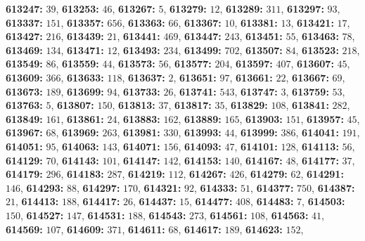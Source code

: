 \textsf{\bfseries 613247:} $39$, \textsf{\bfseries 613253:} $46$, \textsf{\bfseries 613267:} $5$, \textsf{\bfseries 613279:} $12$, \textsf{\bfseries 613289:} $311$, \textsf{\bfseries 613297:} $93$, \textsf{\bfseries 613337:} $151$, \textsf{\bfseries 613357:} $656$, \textsf{\bfseries 613363:} $66$, \textsf{\bfseries 613367:} $10$, \textsf{\bfseries 613381:} $13$, \textsf{\bfseries 613421:} $17$, \textsf{\bfseries 613427:} $216$, \textsf{\bfseries 613439:} $21$, \textsf{\bfseries 613441:} $469$, \textsf{\bfseries 613447:} $243$, \textsf{\bfseries 613451:} $55$, \textsf{\bfseries 613463:} $78$, \textsf{\bfseries 613469:} $134$, \textsf{\bfseries 613471:} $12$, \textsf{\bfseries 613493:} $234$, \textsf{\bfseries 613499:} $702$, \textsf{\bfseries 613507:} $84$, \textsf{\bfseries 613523:} $218$, \textsf{\bfseries 613549:} $86$, \textsf{\bfseries 613559:} $44$, \textsf{\bfseries 613573:} $56$, \textsf{\bfseries 613577:} $204$, \textsf{\bfseries 613597:} $407$, \textsf{\bfseries 613607:} $45$, \textsf{\bfseries 613609:} $366$, \textsf{\bfseries 613633:} $118$, \textsf{\bfseries 613637:} $2$, \textsf{\bfseries 613651:} $97$, \textsf{\bfseries 613661:} $22$, \textsf{\bfseries 613667:} $69$, \textsf{\bfseries 613673:} $189$, \textsf{\bfseries 613699:} $94$, \textsf{\bfseries 613733:} $26$, \textsf{\bfseries 613741:} $543$, \textsf{\bfseries 613747:} $3$, \textsf{\bfseries 613759:} $53$, \textsf{\bfseries 613763:} $5$, \textsf{\bfseries 613807:} $150$, \textsf{\bfseries 613813:} $37$, \textsf{\bfseries 613817:} $35$, \textsf{\bfseries 613829:} $108$, \textsf{\bfseries 613841:} $282$, \textsf{\bfseries 613849:} $161$, \textsf{\bfseries 613861:} $24$, \textsf{\bfseries 613883:} $162$, \textsf{\bfseries 613889:} $165$, \textsf{\bfseries 613903:} $151$, \textsf{\bfseries 613957:} $45$, \textsf{\bfseries 613967:} $68$, \textsf{\bfseries 613969:} $263$, \textsf{\bfseries 613981:} $330$, \textsf{\bfseries 613993:} $44$, \textsf{\bfseries 613999:} $386$, \textsf{\bfseries 614041:} $191$, \textsf{\bfseries 614051:} $95$, \textsf{\bfseries 614063:} $143$, \textsf{\bfseries 614071:} $156$, \textsf{\bfseries 614093:} $47$, \textsf{\bfseries 614101:} $128$, \textsf{\bfseries 614113:} $56$, \textsf{\bfseries 614129:} $70$, \textsf{\bfseries 614143:} $101$, \textsf{\bfseries 614147:} $142$, \textsf{\bfseries 614153:} $140$, \textsf{\bfseries 614167:} $48$, \textsf{\bfseries 614177:} $37$, \textsf{\bfseries 614179:} $296$, \textsf{\bfseries 614183:} $287$, \textsf{\bfseries 614219:} $112$, \textsf{\bfseries 614267:} $426$, \textsf{\bfseries 614279:} $62$, \textsf{\bfseries 614291:} $146$, \textsf{\bfseries 614293:} $88$, \textsf{\bfseries 614297:} $170$, \textsf{\bfseries 614321:} $92$, \textsf{\bfseries 614333:} $51$, \textsf{\bfseries 614377:} $750$, \textsf{\bfseries 614387:} $21$, \textsf{\bfseries 614413:} $188$, \textsf{\bfseries 614417:} $26$, \textsf{\bfseries 614437:} $15$, \textsf{\bfseries 614477:} $408$, \textsf{\bfseries 614483:} $7$, \textsf{\bfseries 614503:} $150$, \textsf{\bfseries 614527:} $147$, \textsf{\bfseries 614531:} $188$, \textsf{\bfseries 614543:} $273$, \textsf{\bfseries 614561:} $108$, \textsf{\bfseries 614563:} $41$, \textsf{\bfseries 614569:} $107$, \textsf{\bfseries 614609:} $371$, \textsf{\bfseries 614611:} $68$, \textsf{\bfseries 614617:} $189$, \textsf{\bfseries 614623:} $152$, 
